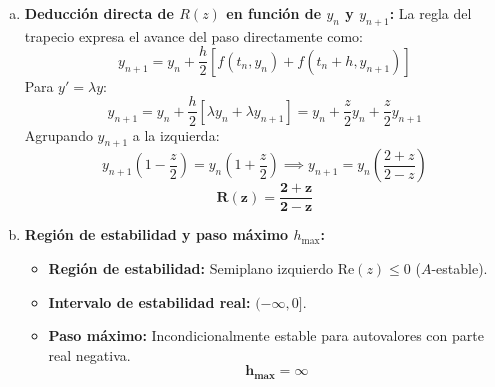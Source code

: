 \begin{sol}
\begin{enumerate}
    \begin{enumerate}[a)]
        \item \textbf{Deducción directa de $R(z)$ en función de $y_n$ y $y_{n+1}$:}
        La regla del trapecio expresa el avance del paso directamente como:
        \[
        y_{n+1} = y_n + \frac{h}{2} \left[ f(t_n, y_n) + f(t_n + h, y_{n+1}) \right]
        \]
        Para $y' = \lambda y$:
        \[
        y_{n+1} = y_n + \frac{h}{2} \left[ \lambda y_n + \lambda y_{n+1} \right] = y_n + \frac{z}{2} y_n + \frac{z}{2} y_{n+1}
        \]
        Agrupando $y_{n+1}$ a la izquierda:
        \[
        y_{n+1} \left(1 - \frac{z}{2}\right) = y_n \left(1 + \frac{z}{2}\right) \implies y_{n+1} = y_n \left(\frac{2 + z}{2 - z}\right)
        \]
        \[
        \mathbf{R(z) = \frac{2 + z}{2 - z}}
        \]
        
        \item \textbf{Región de estabilidad y paso máximo $h_{\max}$:}
        \begin{itemize}
            \item \textbf{Región de estabilidad:} Semiplano izquierdo $\text{Re}(z) \le 0$ ($A$-estable).
            \item \textbf{Intervalo de estabilidad real:} $(-\infty, 0]$.
            \item \textbf{Paso máximo:} Incondicionalmente estable para autovalores con parte real negativa.
            \[
            \mathbf{h_{\max} = \infty}
            \]
        \end{itemize}
    \end{enumerate}
\end{enumerate}
\end{sol}